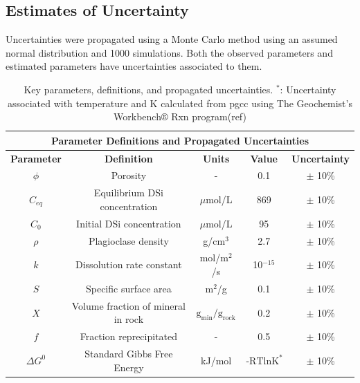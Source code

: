 \FloatBarrier


\subsection{Estimates of Uncertainty}

Uncertainties were propagated using a Monte Carlo method using an assumed normal distribution and 1000 simulations. Both the observed parameters and estimated parameters have uncertainties associated to them.


\begin{table}[H]
    \centering
    \renewcommand{\arraystretch}{1.3} %
    {\small
    \begin{tabular}{|c|c|c|c|c|}
        \hline
        \multicolumn{5}{|c|}{\textbf{Parameter Definitions and Propagated Uncertainties}} \\  
        \hline
        \textbf{Parameter} & \textbf{Definition} & \textbf{Units} & \textbf{Value} & \textbf{Uncertainty} \\  
        \hline
        $\phi$ & Porosity & - & 0.1 & $\pm$ 10\% \\  
        $C_{eq}$ & Equilibrium DSi concentration & $\mu$mol/L & 869 & $\pm$ 10\% \\  
        $C_0$ & Initial DSi concentration & $\mu$mol/L & 95 & $\pm$ 10\% \\  
        $\rho$ & Plagioclase density & g/cm$^3$ & 2.7 & $\pm$ 10\% \\  
        $k$ & Dissolution rate constant & mol/m$^2$/s & 10$^{-15}$ & $\pm$ 10\% \\  
        $S$ & Specific surface area & m$^2$/g & 0.1 & $\pm$ 10\% \\  
        $X$ & Volume fraction of mineral in rock & $\text{g}_{\text{min}}/\text{g}_{\text{rock}}$ & 0.2 & $\pm$ 10\% \\   
        $f$ & Fraction reprecipitated & - & 0.5 & $\pm$ 10\% \\
        $\Delta G^0$ & Standard Gibbs Free Energy & kJ/mol & $\text{-RTlnK}^*$ & $\pm$ 10\% \\
        \hline
    \end{tabular}}
    \caption{Key parameters, definitions, and propagated uncertainties. $^*$: Uncertainty associated with temperature and K calculated from pgcc using The Geochemist's Workbench® Rxn program(ref)}
    \label{tab:montecarlo}
\end{table}

\FloatBarrier




